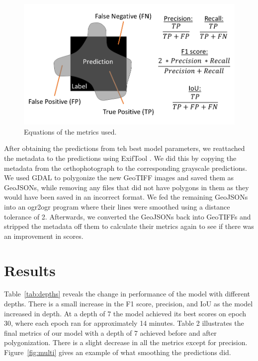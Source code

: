 \documentclass[acmtog, authorversion]{acmart}
\begin{document}
\begin{figure}
  \includegraphics[width=1.0\linewidth]{Images/Metrics.png}
  \caption{Equations of the metrics used.}
  \label{fig:metrics}
\end{figure}

After obtaining the predictions from teh best model parameters, we reattached the metadata to the predictions using ExifTool \cite{Harvey2019}. We did this by copying the metadata from the orthophotograph to the corresponding grayscale predictions. We used GDAL to polygonize the new GeoTIFF images and saved them as GeoJSONs, while removing any files that did not have polygons in them as they would have been saved in an incorrect format. We fed the remaining GeoJSONs into an ogr2ogr program where their lines were smoothed using a distance tolerance of 2. Afterwards, we converted the GeoJSONs back into GeoTIFFs and stripped the metadata off them to calculate their metrics again to see if there was an improvement in scores.

\section{Results}
 Table~\ref{tab:depths} reveals the change in performance of the model with different depths. There is a small increase in the F1 score, precision, and IoU as the model increased in depth. At a depth of 7 the model achieved its best scores on epoch 30, where each epoch ran for approximately 14 minutes. Table 2 illustrates the final metrics of our model with a depth of 7 achieved before and after polygonization. There is a slight decrease in all the metrics except for precision. Figure~\ref{fig:multi} gives an example of what smoothing the predictions did.
\end{document}
